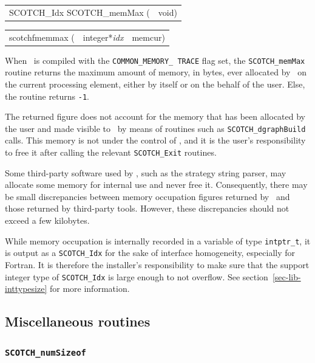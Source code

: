 \begin{itemize}
\progsyn

{\tt\begin{tabular}{l@{}l}
SCOTCH\_Idx SCOTCH\_memMax ( & void)
\end{tabular}}

{\tt\begin{tabular}{l@{}ll}
scotchfmemmax ( & integer*{\it idx} & memcur) \\

\end{tabular}}

\progdes

When \scotch\ is compiled with the {\tt COMMON\_\lbt MEMORY\_\lbt
TRACE} flag set, the {\tt SCOTCH\_memMax} routine returns the maximum
amount of memory, in bytes, ever allocated by \scotch\ on the current
processing element, either by itself or on the behalf of the
user. Else, the routine returns {\tt -1}.

The returned figure does not account for the memory that has been
allocated by the user and made visible to \scotch\ by means of
routines such as {\tt SCOTCH\_\lbt dgraph\lbt Build} calls. This
memory is not under the control of \scotch, and it is the user's
responsibility to free it after calling the relevant
{\tt SCOTCH\_\lbt *\lbt Exit} routines.

Some third-party software used by \scotch, such as the strategy string
parser, may allocate some memory for internal use and never free it.
Consequently, there may be small discrepancies between memory
occupation figures returned by \scotch\ and those returned by
third-party tools. However, these discrepancies should not exceed a
few kilobytes.

While memory occupation is internally recorded in a variable of type
{\tt intptr\_\lbt t}, it is output as a {\tt SCOTCH\_\lbt Idx} for the
sake of interface homogeneity, especially for Fortran. It is therefore
the installer's responsibility to make sure that the support integer
type of {\tt SCOTCH\_\lbt Idx} is large enough to not overflow. See
section~\ref{sec-lib-inttypesize} for more information.
\end{itemize}

\subsection{Miscellaneous routines}
\label{sec-lib-misc}

\subsubsection{{\tt SCOTCH\_numSizeof}}

